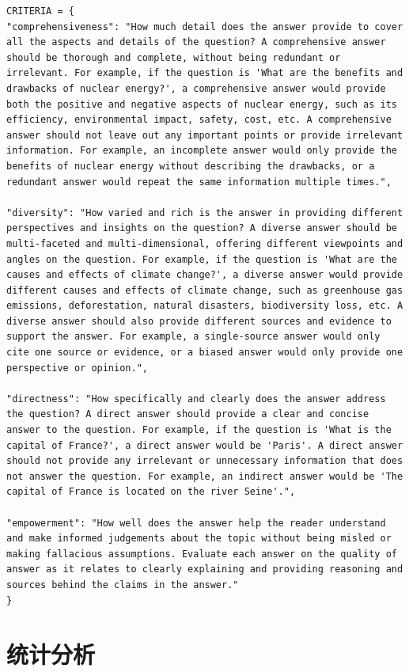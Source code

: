 \documentclass[11pt,UTF8,fontset=fandol]{ctexart}
\begin{document}
\begin{lstlisting}[style=promptstyle]
CRITERIA = {
"comprehensiveness": "How much detail does the answer provide to cover all the aspects and details of the question? A comprehensive answer should be thorough and complete, without being redundant or irrelevant. For example, if the question is 'What are the benefits and drawbacks of nuclear energy?', a comprehensive answer would provide both the positive and negative aspects of nuclear energy, such as its efficiency, environmental impact, safety, cost, etc. A comprehensive answer should not leave out any important points or provide irrelevant information. For example, an incomplete answer would only provide the benefits of nuclear energy without describing the drawbacks, or a redundant answer would repeat the same information multiple times.",

"diversity": "How varied and rich is the answer in providing different perspectives and insights on the question? A diverse answer should be multi-faceted and multi-dimensional, offering different viewpoints and angles on the question. For example, if the question is 'What are the causes and effects of climate change?', a diverse answer would provide different causes and effects of climate change, such as greenhouse gas emissions, deforestation, natural disasters, biodiversity loss, etc. A diverse answer should also provide different sources and evidence to support the answer. For example, a single-source answer would only cite one source or evidence, or a biased answer would only provide one perspective or opinion.",

"directness": "How specifically and clearly does the answer address the question? A direct answer should provide a clear and concise answer to the question. For example, if the question is 'What is the capital of France?', a direct answer would be 'Paris'. A direct answer should not provide any irrelevant or unnecessary information that does not answer the question. For example, an indirect answer would be 'The capital of France is located on the river Seine'.",

"empowerment": "How well does the answer help the reader understand and make informed judgements about the topic without being misled or making fallacious assumptions. Evaluate each answer on the quality of answer as it relates to clearly explaining and providing reasoning and sources behind the claims in the answer."
}
\end{lstlisting}

\section{统计分析}
\end{document}
